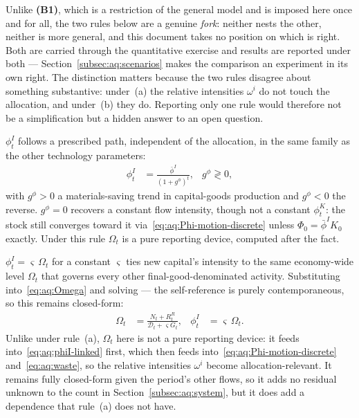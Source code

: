  Unlike \textbf{(B1)}, which is a restriction of the general model and is imposed here once and for all, the two rules below are a genuine \emph{fork}: neither nests the other, neither is more general, and this document takes no position on which is right. Both are carried through the quantitative exercise and results are reported under both --- Section~\ref{subsec:aq:scenarios} makes the comparison an experiment in its own right. The distinction matters because the two rules disagree about something substantive: under~(a) the relative intensities $\omega^i$ do not touch the allocation, and under~(b) they do. Reporting only one rule would therefore not be a simplification but a hidden answer to an open question.

 $\phi^I_t$ follows a prescribed path, independent of the allocation, in the same family as the other technology parameters:
\begin{align}
\phi^I_t &= \frac{\bar\phi^I}{\left(1+g^\phi\right)^t},
&
g^\phi \gtrless 0,
\label{eq:aq:phiI-exogenous}
\end{align}
with $g^\phi>0$ a materials-saving trend in capital-goods production and $g^\phi<0$ the reverse. $g^\phi=0$ recovers a constant flow intensity, though not a constant $\phi^K_t$: the stock still converges toward it via~\eqref{eq:aq:Phi-motion-discrete} unless $\Phi_0=\bar\phi^IK_0$ exactly. Under this rule $\Omega_t$ is a pure reporting device, computed after the fact.

 $\phi^I_t=\varsigma\,\Omega_t$ for a constant $\varsigma$ ties new capital's intensity to the same economy-wide level $\Omega_t$ that governs every other final-good-denominated activity. Substituting into~\eqref{eq:aq:Omega} and solving --- the self-reference is purely contemporaneous, so this remains closed-form:
\begin{align}
\Omega_t &= \frac{N_t+R^R_t}{\mathcal D_t+\varsigma G_t},
&
\phi^I_t &= \varsigma\,\Omega_t.
\label{eq:aq:phiI-linked}
\end{align}
Unlike under rule~(a), $\Omega_t$ here is not a pure reporting device: it feeds into~\eqref{eq:aq:phiI-linked} first, which then feeds into~\eqref{eq:aq:Phi-motion-discrete} and~\eqref{eq:aq:waste}, so the relative intensities $\omega^i$ become allocation-relevant. It remains fully closed-form given the period's other flows, so it adds no residual unknown to the count in Section~\ref{subsec:aq:system}, but it does add a dependence that rule~(a) does not have.

